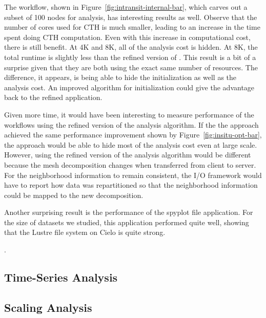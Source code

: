 The \intransit workflow, shown in Figure~\ref{fig:intransit-internal-bar},
which carves out a subset of 100 nodes for analysis, has interesting
results as well.  Observe that the number of cores used for CTH is much
smaller, leading to an increase in the time spent doing CTH computation.
Even with this increase in computational cost, there is still benefit.  At
4K and 8K, all of the analysis cost is hidden.  At 8K, the total runtime is
slightly less than the refined version of \insitu.  This result is a bit
of a surprise given that they are both using the exact same number of
resources.  The difference, it appears, is being able to hide the
initialization as well as the analysis cost.   An
improved algorithm for initialization could give the advantage back to the
refined \insitu application.

Given more time, it would have been interesting to measure
performance of the \intransit workflows using the refined version of
the analysis algorithm.  If the the \intransit approach achieved the same
performance improvement shown by Figure~\ref{fig:insitu-opt-bar}, the
\intransit approach would be able to hide most of the analysis cost even at
large scale.  However, using the refined version of the analysis algorithm
would be different because the mesh decomposition changes when transferred
from client to server.  For the neighborhood information to remain
consistent, the I/O framework would have to report how data was
repartitioned so that the neighborhood information could be mapped to the
new decomposition.

Another surprising result is the performance of the spyplot file application.  
For the size of datasets we studied, this application performed quite well, showing that
the Lustre file system on Cielo is quite strong. 

. 


\subsection{Time-Series Analysis}



\subsection{Scaling Analysis}

